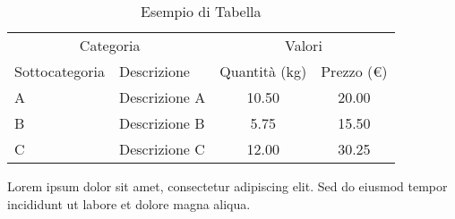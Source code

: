 \documentclass[12pt, a4paper, twoside]{article}
\begin{document}
\begin{table}[ht] %
    \centering %
    \caption{Esempio di Tabella} %
    \begin{tabular}{llcc} %
        \toprule %
        \multicolumn{2}{c}{Categoria} & \multicolumn{2}{c}{Valori} \\ %
        
        \cmidrule(lr){1-2} \cmidrule(lr){3-4} 
        
        Sottocategoria & Descrizione & Quantità (kg) & Prezzo (€) \\ %
        \midrule %

        A & Descrizione A & 10.50 & 20.00 \\ %
        B & Descrizione B & 5.75 & 15.50 \\ %
        C & Descrizione C & 12.00 & 30.25 \\ %
        
        \bottomrule %
    \end{tabular} %
    \label{tab:esempio} 
\end{table} %

Lorem ipsum dolor sit amet, consectetur adipiscing elit. \cite{opera2} Sed do eiusmod tempor incididunt ut labore et dolore magna aliqua. \cite{opera3}
\end{document}
